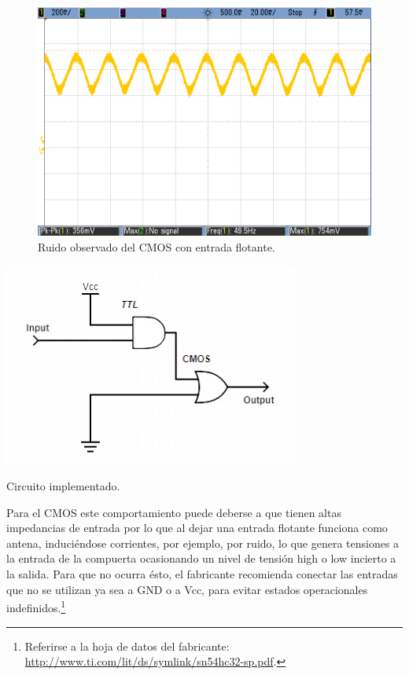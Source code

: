 \begin{figure}[H]
    \centering
    \includegraphics[width=.5\linewidth]{./ruidoCMOS.png}
    \caption{Ruido observado del CMOS con entrada flotante.}
    \label{fig:ruidoCMOS}
\end{figure}

\vspace{20mm}
\begin{table}
    \begin{center}
        \includegraphics[scale=0.5]{./circuito.jpg}
        \caption{Circuito implementado.}
        \label{fig:circuito}
    \end{center}
\end{table} 
\par
Para el CMOS este comportamiento puede deberse a que tienen altas impedancias de entrada por lo que al dejar una entrada flotante
funciona como antena, induciéndose corrientes, por ejemplo, por ruido, lo que genera tensiones a la entrada de la compuerta
ocasionando un nivel de tensión high o low incierto a la salida.
Para que no ocurra ésto, el fabricante recomienda conectar las entradas que no se utilizan ya sea a GND o a Vcc, 
para evitar estados operacionales indefinidos.\footnote{Referirse a la hoja de datos del fabricante: \url{http://www.ti.com/lit/ds/symlink/sn54hc32-sp.pdf}.}\\\newline

